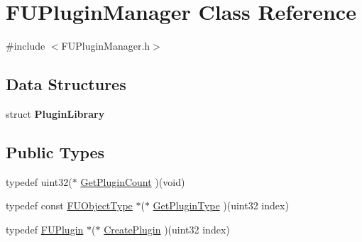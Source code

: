 \hypertarget{classFUPluginManager}{
\section{FUPluginManager Class Reference}
\label{classFUPluginManager}
}


{\ttfamily \#include $<$FUPluginManager.h$>$}

\subsection*{Data Structures}
\begin{DoxyCompactItemize}
\item 
struct {\bfseries PluginLibrary}
\end{DoxyCompactItemize}
\subsection*{Public Types}
\begin{DoxyCompactItemize}
\item 
typedef uint32($\ast$ \hyperlink{classFUPluginManager_aa7465d51db4f1f1e0386310ae6922250}{GetPluginCount} )(void)
\item 
typedef const \hyperlink{classFUObjectType}{FUObjectType} $\ast$($\ast$ \hyperlink{classFUPluginManager_ad253785d39bca14d77ddf9d9181e7fb1}{GetPluginType} )(uint32 index)
\item 
typedef \hyperlink{classFUPlugin}{FUPlugin} $\ast$($\ast$ \hyperlink{classFUPluginManager_a8e4ad834c03cad334f3bbd6158416a43}{CreatePlugin} )(uint32 index)
\end{DoxyCompactItemize}
